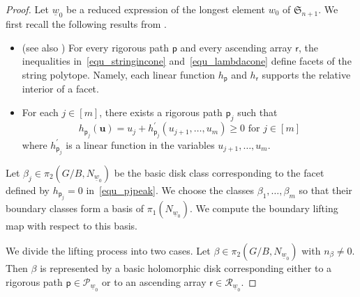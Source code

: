 \documentclass[11pt]{amsart}
\theoremstyle{plain}
\theoremstyle{definition}
\theoremstyle{remark}
\numberwithin{equation}{section} \numberwithin{table}{section}
\numberwithin{equation}{section}
\begin{document}
\begin{proof}
Let $\underline{w}_0$ be a reduced expression of the longest element $w_0$ of $\mathfrak{S}_{n+1}$. 
We first recall the following results from \cite{CKLP21}. 
\begin{itemize}
\item \cite[Proposition 4.5]{CKLP21} (see also \cite{KS22})  For every rigorous path $\mathsf{p}$ and every ascending array $\mathsf{r}$, the inequalities in~\eqref{equ_stringincone} and~\eqref{equ_lambdacone} define facets of the string polytope. Namely, each linear function $h_{\mathsf{p}}$ and $h_{\mathsf{r}}$ supports the relative interior of a facet.
\item \cite[Proposition 5.6]{CKLP21} For each $j \in [m]$, there exists a rigorous path $\mathsf{p}_j$ such that 
\begin{equation}\label{equ_pjpeak}
h_{\mathsf{p}_j} (\mathbf{u}) = u_j + h^\prime_{\mathsf{p}_j}(u_{j+1}, \dots, u_m) \geq 0 \mbox{ for $j \in [m]$}
\end{equation}
where $h^\prime_{\mathsf{p}_j}$ is a linear function in the variables $u_{j+1}, \dots, u_m$.
\end{itemize} 

Let $\beta_j \in \pi_2(G/B, N_{\underline{w}_0})$ be the basic disk class corresponding to the facet defined by $h_{\mathsf{p}_j} = 0$ in~\eqref{equ_pjpeak}. We choose the classes $\beta_1, \dots, \beta_m$ so that their boundary classes form a basis of $\pi_1(N_{\underline{w}_0})$. We compute the boundary lifting map with respect to this basis.  

We divide the lifting process into two cases. Let $\beta \in \pi_2(G/B, N_{\underline{w}_0})$ with $n_\beta \neq 0$. Then $\beta$ is represented by a basic holomorphic disk corresponding either to a rigorous path $\mathsf{p} \in \mathcal{P}_{\underline{w}_0}$ or to an ascending array $\mathsf{r} \in \mathcal{R}_{\underline{w}_0}$.  


\end{proof}
\end{document}

